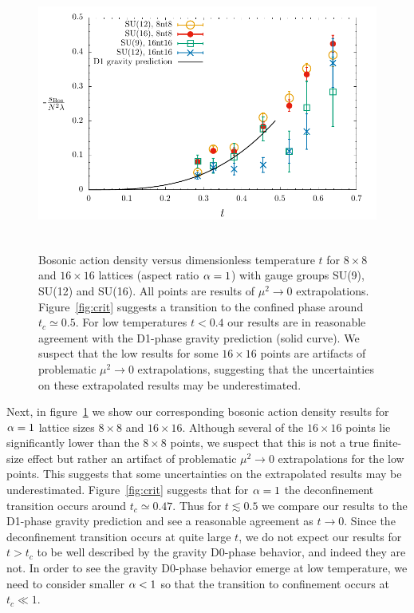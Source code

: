\begin{figure}[tbp]
  \centering
  \includegraphics[height=9cm]{Figures/alpha1.pdf}
  \caption{\label{fig:alpha1}Bosonic action density versus dimensionless temperature $t$ for $8\times 8$ and $16\times 16$ lattices (aspect ratio $\alpha = 1$) with gauge groups SU(9), SU(12) and SU(16).  All points are results of $\mu^2 \to 0$ extrapolations.  Figure~\protect\ref{fig:crit} suggests a transition to the confined phase around $t_c \simeq 0.5$.  For low temperatures $t < 0.4$ our results are in reasonable agreement with the D1-phase gravity prediction (solid curve).  We suspect that the low results for some $16\times 16$ points are artifacts of problematic $\mu^2 \to 0$ extrapolations, suggesting that the uncertainties on these extrapolated results may be underestimated.}
\end{figure}

Next, in figure~\ref{fig:alpha1} we show our corresponding bosonic action density results for $\alpha = 1$ lattice sizes $8\times 8$ and $16\times 16$.
Although several of the $16\times 16$ points lie significantly lower than the $8\times 8$ points, we suspect that this is not a true finite-size effect but rather an artifact of problematic $\mu^2 \to 0$ extrapolations for the low points.
This suggests that some uncertainties on the extrapolated results may be underestimated.
Figure~\ref{fig:crit} suggests that for $\alpha = 1$ the deconfinement transition occurs around $t_c \simeq 0.47$.
Thus for $t \lesssim 0.5$ we compare our results to the D1-phase gravity prediction and see a reasonable agreement as $t \to 0$.
Since the deconfinement transition occurs at quite large $t$, we do not expect our results for $t > t_c$ to be well described by the gravity D0-phase behavior, and indeed they are not.
In order to see the gravity D0-phase behavior emerge at low temperature, we need to consider smaller $\alpha < 1$ so that the transition to confinement occurs at $t_c \ll 1$.

